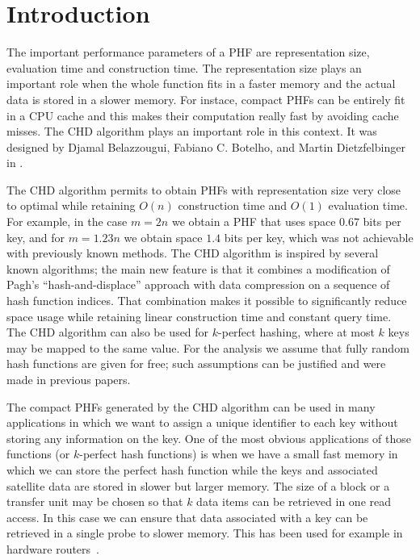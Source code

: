 \section{Introduction} \label{sec:introduction}


The important performance parameters of a PHF are representation size, evaluation time and construction time. The representation size plays an important role when the whole function fits in a faster memory and the actual data is stored in a slower memory. For instace, compact PHFs can be entirely fit in a CPU cache and this makes their computation really fast by avoiding cache misses. The CHD algorithm plays an important role in this context. It was designed by Djamal Belazzougui, Fabiano C. Botelho, and Martin Dietzfelbinger in \cite{bbd09}.


The CHD algorithm permits to obtain PHFs with representation size very close to optimal while retaining $O(n)$ construction time and $O(1)$ evaluation time. For example, in the case $m=2n$ we obtain a PHF that uses space $0.67$ bits per key, and for $m=1.23n$ we obtain space $1.4$ bits per key, which was not achievable with previously known methods. The CHD algorithm is inspired by several known algorithms;
the main new feature is that it combines a modification of Pagh's ``hash-and-displace'' approach
with data compression on a sequence of hash function indices.
That combination makes it possible to significantly reduce space usage
while retaining linear construction time and constant query time.
The CHD algorithm can also be used for $k$-perfect hashing,
where at most $k$ keys may be mapped to the same value.
For the analysis we assume that fully random hash functions are given for free;
such assumptions can be justified and were made in previous papers.

The compact PHFs generated by the CHD algorithm can be used in many applications in which we want to assign a unique identifier to each key without storing any information on the key. One of the most obvious applications of those functions
(or $k$-perfect hash functions) is when we have a small fast memory in which we can store the perfect hash function while the keys and associated satellite data are stored in slower but larger memory.
The size of a block or a transfer unit may be chosen so that $k$ data items can be retrieved in
one read access. In this case we can ensure that data associated with a key can be retrieved in a single probe to slower memory. This has been used for example in hardware routers~\cite{pb06}.


